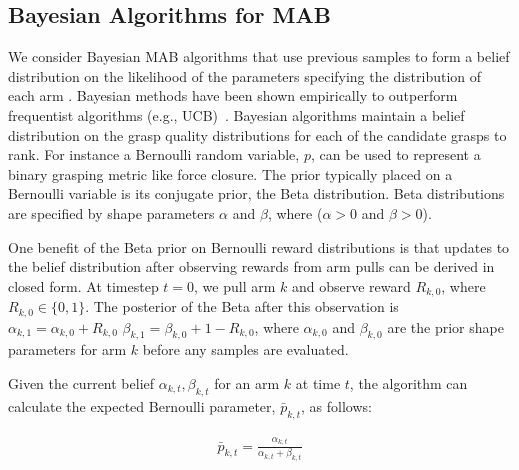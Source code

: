 \documentclass[10pt, conference]{ieeeconf}      %
\begin{document}
\subsection{Bayesian Algorithms for MAB}\label{sec:bandit_algorithm}
We consider Bayesian MAB algorithms that use previous samples to form a belief distribution on the likelihood of the parameters specifying the distribution of each arm \cite{weber1992gittins,agrawal2011analysis}.  Bayesian methods have been shown empirically to outperform frequentist algorithms (e.g., UCB)~\cite{chapelle2011empirical, bachman2013greedy}. Bayesian algorithms maintain a belief distribution on the grasp quality distributions for each of the candidate grasps to rank. For instance a Bernoulli random variable, $p$, can be used to represent a binary grasping metric like force closure. The prior typically placed on a Bernoulli variable is its conjugate prior, the Beta distribution. 
Beta distributions are specified by shape parameters $\alpha$ and $\beta$, where ($\alpha >0$ and $\beta >0$).


One benefit of the Beta prior on Bernoulli reward distributions is that updates to the belief distribution after observing rewards from arm pulls can be derived in closed form.
At timestep $t=0$, we pull arm $k$ and observe reward $R_{k,0}$, where $R_{k,0} \in \lbrace 0, 1\rbrace$.
The posterior of the Beta after this observation is $\alpha_{k, 1} = \alpha_{k, 0} + R_{k,0}$  $\beta_{k, 1} = \beta_{k, 0} + 1-R_{k,0}$, where $\alpha_{k,0}$ and $\beta_{k,0}$ are the prior shape parameters for arm $k$ before any samples are evaluated.

Given the current belief $\alpha_{k, t}, \beta_{k, t}$ for an arm $k$ at time $t$, the algorithm can calculate the expected Bernoulli parameter, $\bar{p}_{k,t}$, as follows:

\vspace{-2ex}
\begin{align}\label{eq:shape_sampling}
\bar{p}_{k,t} = \frac{\alpha_{k,t}}{\alpha_{k,t} + \beta_{k,t}}
\end{align}




\end{document}

